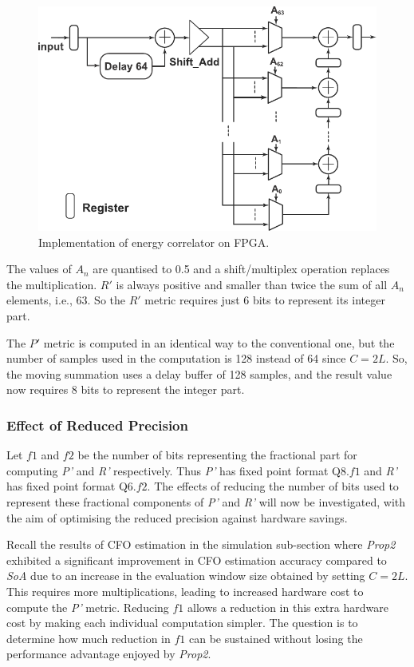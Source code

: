 \begin{figure}[h]
	\centerline{\includegraphics [width=0.6\columnwidth] {figures/ML_Cor.pdf}}
	\caption{Implementation of energy correlator on FPGA.}
	\label{fig:ML-Cor}
\end{figure}

The values of $A_n$ are quantised to 0.5 and a shift/multiplex operation replaces the multiplication.
$R'$ is always positive and smaller than twice the sum of all $A_n$ elements, i.e., 63. So the $R'$ metric requires just 6 bits to represent its integer part.

The $P'$ metric is computed in an identical way to the conventional one, but the number of samples used in the computation is 128 instead of 64 since $C=2L$.
So, the moving summation uses a delay buffer of 128 samples, and the result value now requires 8 bits to represent the integer part.

\subsubsection{Effect of Reduced Precision}

Let $f1$ and $f2$ be the number of bits representing the fractional part for computing \emph{P'}  and \emph{R'} respectively. Thus \emph{P'} has fixed point format Q8.$f1$ and \emph{R'} has fixed point format Q6.$f2$.
The effects of reducing the number of bits used to represent these fractional components of  \emph{P'}  and \emph{R'}  will now be investigated, with the aim of optimising the reduced precision against hardware savings.

Recall the results of CFO estimation in the simulation sub-section where \textit{Prop2} exhibited a significant improvement in CFO estimation accuracy compared to \textit{SoA} due to an increase in the evaluation window size obtained by setting $C=2L$. This requires more multiplications, leading to increased hardware cost to compute the \emph{P'} metric. Reducing $f1$ allows a reduction in this extra hardware cost by making each individual computation simpler. The question is to determine how much reduction in $f1$ can be sustained without losing the performance advantage enjoyed by \textit{Prop2}.

